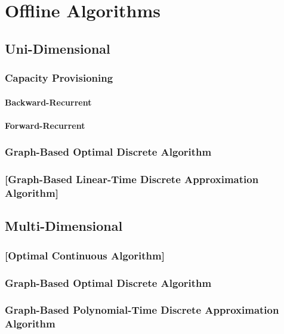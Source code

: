 
\chapter{Offline Algorithms}\label{chapter:algorithms}

\section{Uni-Dimensional}

\subsection{Capacity Provisioning}

\subsubsection{Backward-Recurrent}

\subsubsection{Forward-Recurrent}

\subsection{Graph-Based Optimal Discrete Algorithm}

\subsection{[Graph-Based Linear-Time Discrete Approximation Algorithm]}

\section{Multi-Dimensional}

\subsection{[Optimal Continuous Algorithm]}

\subsection{Graph-Based Optimal Discrete Algorithm}

\subsection{Graph-Based Polynomial-Time Discrete Approximation Algorithm}
